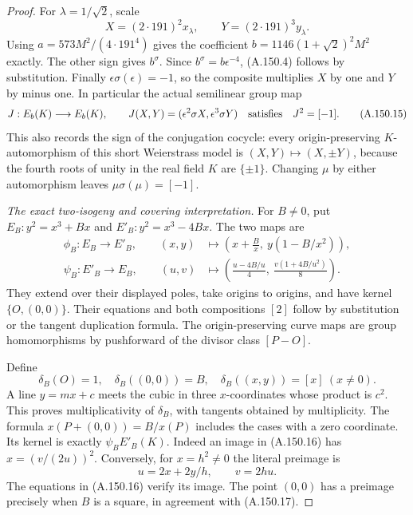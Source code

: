 \begin{proof}
For \(\lambda=1/\sqrt2\), scale
\[
           X=(2\cdot191)^2x_\lambda,\qquad
           Y=(2\cdot191)^3y_\lambda.
\tag{A.150.14}
\]
Using \(a=573M^2/(4\cdot191^4)\) gives the coefficient
\(b=1146(1+\sqrt2)^2M^2\) exactly.
The other sign gives \(b^\sigma\).
Since \(b^\sigma=b\epsilon^{-4}\), (A.150.4) follows by
substitution.  Finally \(\epsilon\sigma(\epsilon)=-1\),
so the composite multiplies \(X\) by one and \(Y\) by minus
one.  In particular the actual semilinear group map
\[
 J:E_b(K)\longrightarrow E_b(K),\qquad
 J(X,Y)=(\epsilon^2\sigma X,\epsilon^3\sigma Y)
 \quad\hbox{satisfies}\quad J^2=[-1].
\tag{A.150.15}
\]
This also records the sign of the conjugation cocycle:
every origin-preserving \(K\)-automorphism of this short
Weierstrass model is \((X,Y)\mapsto(X,\pm Y)\), because
the fourth roots of unity in the real field \(K\) are
\(\{\pm1\}\).  Changing \(\mu\) by either automorphism
leaves \(\mu\sigma(\mu)=[-1]\).

\emph{The exact two-isogeny and covering interpretation.}
For \(B\ne0\), put \(E_B:y^2=x^3+Bx\) and
\(E'_B:y^2=x^3-4Bx\).  The two maps are
\[
 \begin{aligned}
 \phi_B:E_B\longrightarrow E'_B,\qquad
     (x,y)&\longmapsto
            \left(x+\frac Bx,\ y(1-B/x^2)\right),\\
 \psi_B:E'_B\longrightarrow E_B,\qquad
     (u,v)&\longmapsto
            \left(\frac{u-4B/u}{4},\
                         \frac{v(1+4B/u^2)}8\right).
 \end{aligned}
\tag{A.150.16}
\]
They extend over their displayed poles, take origins to
origins, and have kernel \(\{O,(0,0)\}\).
Their equations and both compositions \([2]\) follow by
substitution or the tangent duplication formula.
The origin-preserving curve maps are group homomorphisms
by pushforward of the divisor class \([P-O]\).

Define
\[
 \delta_B(O)=1,\quad \delta_B((0,0))=B,\quad
                   \delta_B((x,y))=[x]\ (x\ne0).
\tag{A.150.17}
\]
A line \(y=mx+c\) meets the cubic in three \(x\)-coordinates
whose product is \(c^2\).  This proves multiplicativity
of \(\delta_B\), with tangents obtained by multiplicity.
The formula \(x(P+(0,0))=B/x(P)\) includes the cases
with a zero coordinate.
Its kernel is exactly \(\psi_B E'_B(K)\).
Indeed an image in (A.150.16) has
\(x=(v/(2u))^2\).  Conversely, for \(x=h^2\ne0\) the
literal preimage is
\[
                 u=2x+2y/h,\qquad v=2hu .
\tag{A.150.18}
\]
The equations in (A.150.16) verify its image.
The point \((0,0)\) has a preimage precisely when \(B\)
is a square, in agreement with (A.150.17).


\end{proof}
